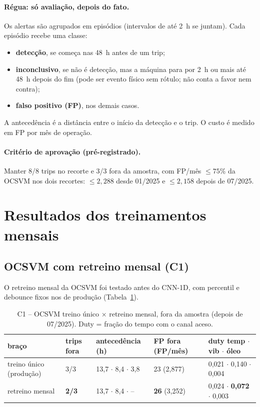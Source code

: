 \documentclass[11pt,a4paper]{article}
\begin{document}
\paragraph{Régua: só avaliação, depois do fato.} Os alertas são agrupados em episódios (intervalos de até 2~h se
juntam). Cada episódio recebe uma classe:
\begin{itemize}
  \item \textbf{detecção}, se começa nas 48~h antes de um trip;
  \item \textbf{inconclusivo}, se não é detecção, mas a máquina para por 2~h ou mais até 48~h depois do fim
        (pode ser evento físico sem rótulo; não conta a favor nem contra);
  \item \textbf{falso positivo (FP)}, nos demais casos.
\end{itemize}
A antecedência é a distância entre o início da detecção e o trip. O custo é medido em FP por mês de operação.

\paragraph{Critério de aprovação (pré-registrado).} Manter 8/8 trips no recorte e 3/3 fora da amostra, com FP/mês
$\leq 75\%$ da OCSVM nos dois recortes: $\leq 2{,}288$ desde 01/2025 e $\leq 2{,}158$ depois de 07/2025.

\section{Resultados dos treinamentos mensais}
\label{sec:resultados}

\subsection{OCSVM com retreino mensal (C1)}

O retreino mensal da OCSVM foi testado antes do CNN-1D, com percentil e debounce fixos nos de produção
(Tabela~\ref{tab:c1}).

\begin{table}[H]
\centering\small
\caption{C1 -- OCSVM treino único $\times$ retreino mensal, fora da amostra (depois de 07/2025). Duty = fração do
tempo com o canal aceso.}
\label{tab:c1}
\begin{tabular}{lllll}
\toprule
braço & trips fora & antecedência (h) & FP fora (FP/mês) & duty temp $\cdot$ vib $\cdot$ óleo \\
\midrule
treino único (produção) & 3/3 & 13,7 $\cdot$ 8,4 $\cdot$ 3,8 & 23 (2,877) & 0,021 $\cdot$ 0,140 $\cdot$ 0,004 \\
retreino mensal & \textbf{2/3} & 13,7 $\cdot$ 8,4 $\cdot$ -- & \textbf{26} (3,252) & 0,024 $\cdot$ \textbf{0,072} $\cdot$ 0,003 \\
\bottomrule
\end{tabular}
\end{table}
\end{document}
